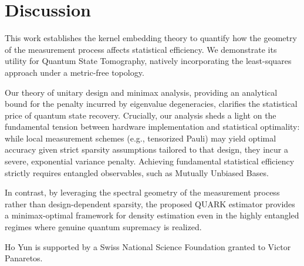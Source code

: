 \documentclass[noinfoline]{imsart}\setcounter{tocdepth}{2}
\theoremstyle{plain}
\begin{document}
\section{Discussion}
This work establishes the kernel embedding theory to quantify how the geometry of the measurement process affects statistical efficiency. We demonstrate its utility for Quantum State Tomography, natively incorporating the least-squares approach under a metric-free topology. 

Our theory of unitary design and minimax analysis, providing an analytical bound for the penalty incurred by eigenvalue degeneracies, clarifies the statistical price of quantum state recovery. Crucially, our analysis sheds a light on the fundamental tension between hardware implementation and statistical optimality: while local measurement schemes (e.g., tensorized Pauli) may yield optimal accuracy given strict sparsity assumptions tailored to that design, they incur a severe, exponential variance penalty. Achieving fundamental statistical efficiency strictly requires entangled observables, such as Mutually Unbiased Bases.

In contrast, by leveraging the spectral geometry of the measurement process rather than design-dependent sparsity, the proposed QUARK estimator provides a minimax-optimal framework for density estimation even in the highly entangled regimes where genuine quantum supremacy is realized. 


\begin{acks}[Acknowledgments]
Ho Yun is supported by a Swiss National Science Foundation granted to Victor Panaretos.
\end{acks}




\newpage
\end{document}
